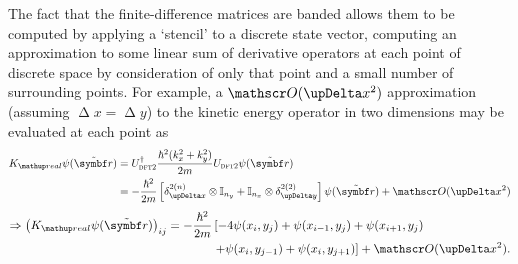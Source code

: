 The fact that the finite-difference matrices are banded allows them to be computed by applying a `stencil' to a discrete state vector, computing an approximation to some linear sum of derivative operators at each point of discrete space by consideration of only that point and a small number of surrounding points. For example, a $\Ord{\upDelta x^2}$ approximation (assuming $\upDelta x = \upDelta y$) to the kinetic energy operator in two dimensions may be evaluated at each point as
\begin{align}
K_\up{real}\psi(\tilde{\vec r}) & = U^\dagger_{\textsc{dft2}} \frac{\hbar^2 (k_x^2 + k_y^2)}{2m} U_{\textsc{dft2}}\psi(\tilde{\vec r})\label{eq:2DKreal}\\
&= -\frac{\hbar^2}{2m} \left[
  \delta^{2 (n)}_{\upDelta x} \otimes \mathbb{I}_{n_y}
+ \mathbb{I}_{n_x} \otimes \delta^{2 (2)}_{\upDelta y}\right]\psi(\tilde{\vec r}) + \Ord{\upDelta x^2}\label{eq:finite_differences_subspaces}
\end{align} 
\begin{align}
\Rightarrow \left(K_\up{real}\psi(\tilde{\vec r})\right)_{ij}
= -\frac{\hbar^2}{2m} &\left[ - 4\psi(x_i,  y_j)
                             + \psi(x_{i-1},  y_j) + \psi(x_{i+1},  y_j) \right.\nonumber\\
                            &\left.  + \psi(x_i,  y_{j-1}) + \psi(x_i,  y_{j+1})\right] + \Ord{\upDelta x^2}.
\end{align} 

